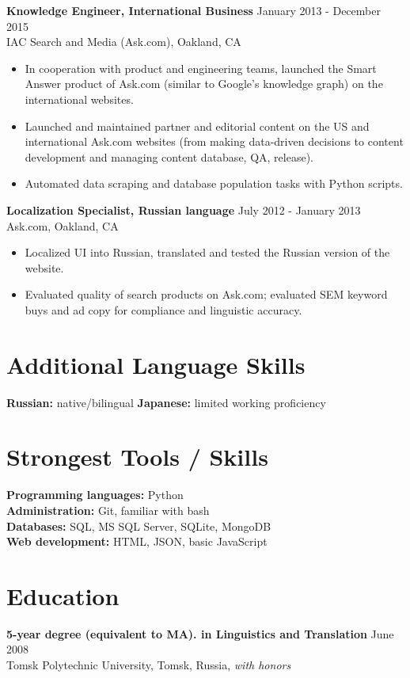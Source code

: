 \documentclass[line]{res}
\begin{document}
\begin{resume}
    \textbf{Knowledge Engineer, International Business} \hfill January 2013 - December 2015 \\
    IAC Search and Media (Ask.com), Oakland, CA
    \begin{itemize} \itemsep -2pt
    \item In cooperation with product and engineering teams, launched the Smart Answer product of Ask.com (similar to Google's knowledge graph) on the international websites.
    \item Launched and maintained partner and editorial content on the US and international Ask.com websites (from making data-driven decisions to content development and managing content database, QA, release).
    \item Automated data scraping and database population tasks with Python scripts.
    \end{itemize}

    \textbf{Localization Specialist, Russian language} \hfill July 2012 - January 2013 \\
    Ask.com, Oakland, CA
    \begin{itemize} \itemsep -2pt
    \item Localized UI into Russian, translated and tested the Russian version of the website.
    \item Evaluated quality of search products on Ask.com; evaluated SEM keyword buys and ad copy for compliance and linguistic accuracy.
    \end{itemize}

\section {Additional Language Skills}
    \textbf{Russian:} native/bilingual
    \textbf{Japanese:} limited working proficiency

\section{Strongest Tools / Skills}
    \textbf{Programming languages:} Python \\
    \textbf{Administration:} Git, familiar with bash \\
    \textbf{Databases:}  SQL, MS SQL Server, SQLite, MongoDB\\
    \textbf{Web development:} HTML, JSON, basic JavaScript \\

\section{Education}
    \textbf{5-year degree (equivalent to MA). in Linguistics and Translation} \hfill June 2008 \\
    Tomsk Polytechnic University, Tomsk, Russia, \textit{with honors}

\end{resume}
\end{document}
